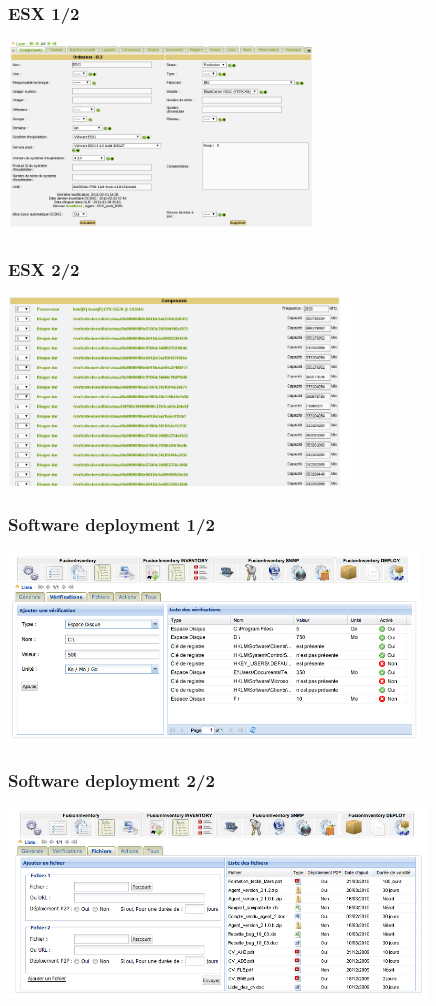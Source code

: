 \documentclass{beamer}
\begin{document}
\begin{frame}
\frametitle{ESX 1/2}


   \includegraphics[height=5cm]{./pics/esx1.png}
\end{frame}
%
\begin{frame}
\frametitle{ESX 2/2}


   \includegraphics[height=5cm]{./pics/esx2.png}
\end{frame}
%


\begin{frame}
\frametitle{Software deployment 1/2}


   \includegraphics[height=5cm]{./pics/software-deployment.png}
\end{frame}
%
\begin{frame}
\frametitle{Software deployment 2/2}


   \includegraphics[height=5cm]{./pics/software-deployment2.png}
\end{frame}
\end{document}
